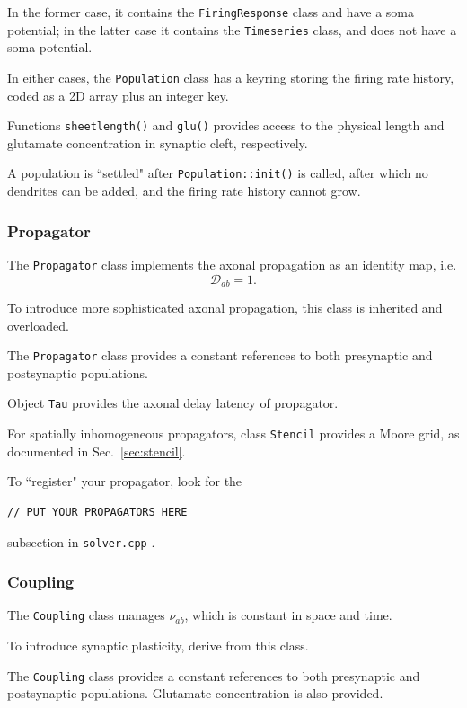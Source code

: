 \documentclass[12pt,a4paper]{article}
\newcommand{\type}[1]{{\small\small\tt #1} }
\begin{document}
In the former case, it contains the \type{FiringResponse} class and have a soma potential; in the latter case it contains the \type{Timeseries} class, and does not have a soma potential.

In either cases, the \type{Population} class has a keyring storing the firing rate history, coded as a 2D array plus an integer key.

Functions \type{sheetlength()} and \type{glu()} provides access to the physical length and glutamate concentration in synaptic cleft, respectively.

A population is ``settled" after \type{Population::init()} is called, after which no dendrites can be added, and the firing rate history cannot grow.

\subsubsection{Propagator}
\label{sec:propagator}

The \type{Propagator} class implements the axonal propagation as an identity map, i.e.
\[ \mathcal{D}_{ab} = 1. \]

To introduce more sophisticated axonal propagation, this class is inherited and overloaded.

The \type{Propagator} class provides a constant references to both presynaptic and postsynaptic populations.

Object \type{Tau} provides the axonal delay latency of propagator.

For spatially inhomogeneous propagators, class \type{Stencil} provides a Moore grid, as documented in Sec.~\ref{sec:stencil}.

To ``register" your propagator, look for the
\begin{lstlisting}
// PUT YOUR PROPAGATORS HERE
\end{lstlisting}
subsection in \type{solver.cpp}.

\subsubsection{Coupling}
\label{sec:coupling_conf}

The \type{Coupling} class manages \(\nu_{ab}\), which is constant in space and time.

To introduce synaptic plasticity, derive from this class.

The \type{Coupling} class provides a constant references to both presynaptic and postsynaptic populations. Glutamate concentration is also provided.
\end{document}
